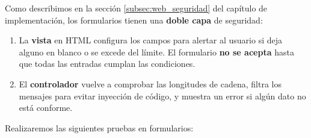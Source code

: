 Como describimos en la sección \ref{subsec:web_seguridad} del capítulo de implementación, los formularios tienen una \textbf{doble capa} de seguridad:

\begin{enumerate}
	\item La \textbf{vista} en \acrshort{HTML} configura los campos para alertar al usuario si deja alguno en blanco o se excede del límite. El formulario \textbf{no se acepta} hasta que todas las entradas cumplan las condiciones.
	
	\item El \textbf{controlador} vuelve a comprobar las longitudes de cadena, filtra los mensajes para evitar inyección de código, y muestra un error si algún dato no está conforme.
\end{enumerate}

Realizaremos las siguientes pruebas en formularios:

